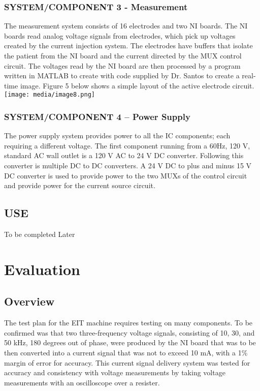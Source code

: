 \subsubsection{SYSTEM/COMPONENT 3 - Measurement}\label{systemcomponent-3---measurement}

The measurement system consists of 16 electrodes and two NI boards. The
NI boards read analog voltage signals from electrodes, which pick up
voltages created by the current injection system. The electrodes have
buffers that isolate the patient from the NI board and the current
directed by the MUX control circuit. The voltages read by the NI board
are then processed by a program written in MATLAB to create with code
supplied by Dr. Santos to create a real-time image. Figure 5 below shows
a simple layout of the active electrode circuit.
\texttt{[image: media/image8.png]}

\subsubsection{SYSTEM/COMPONENT 4 -- Power Supply}\label{systemcomponent-4-power-supply}


The power supply system provides power to all the IC components; each
requiring a different voltage. The first component running from a 60Hz,
120 V, standard AC wall outlet is a 120 V AC to 24 V DC converter.
Following this converter is multiple DC to DC converters. A 24 V DC to
plus and minus 15 V DC converter is used to provide power to the two
MUXs of the control circuit and provide power for the current source
circuit.

\subsection{USE}\label{use}

To be completed Later

\section{Evaluation}\label{evaluation}

\subsection{Overview}\label{overview-1}

The test plan for the EIT machine requires testing on many components.
To be confirmed was that two three-frequency voltage signals, consisting
of 10, 30, and 50 kHz, 180 degrees out of phase, were produced by the NI
board that was to be then converted into a current signal that was not
to exceed 10 mA, with a 1\% margin of error for accuracy. This current
signal delivery system was tested for accuracy and consistency with
voltage measurements by taking voltage measurements with an oscilloscope
over a resister.

